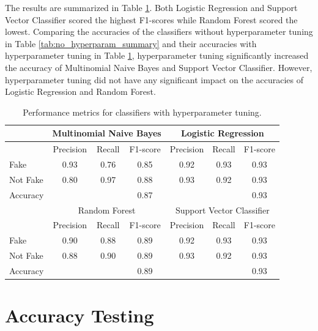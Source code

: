 The results are summarized in Table \ref{tab:hyperparam_summary}. Both Logistic Regression and Support Vector Classifier scored the highest F1-scores while Random Forest scored the lowest. Comparing the accuracies of the classifiers without hyperparameter tuning in Table \ref{tab:no_hyperparam_summary} and their accuracies with hyperparameter tuning in Table \ref{tab:hyperparam_summary}, hyperparameter tuning significantly increased the accuracy of Multinomial Naive Bayes and Support Vector Classifier. However, hyperparameter tuning did not have any significant impact on the accuracies of Logistic Regression and Random Forest.

\begin{table}[ht]
    \centering
    \begin{tabular}{|l|ccc|ccc|}
    \hline
    & \multicolumn{3}{c|}{Multinomial Naive Bayes} & \multicolumn{3}{c|}{Logistic Regression} \\
    \hline
    & Precision & Recall & F1-score & Precision & Recall & F1-score \\
    \hline
    Fake & 0.93 & 0.76 & 0.85 & 0.92 & 0.93 & 0.93 \\
    Not Fake & 0.80 & 0.97 & 0.88 & 0.93 & 0.92 & 0.93 \\
    Accuracy & & & 0.87 & & & 0.93 \\
    \hline
    & \multicolumn{3}{c|}{Random Forest} & \multicolumn{3}{c|}{Support Vector Classifier} \\
    \hline
    & Precision & Recall & F1-score & Precision & Recall & F1-score \\
    \hline
    Fake & 0.90 & 0.88 & 0.89 & 0.92 & 0.93 & 0.93 \\
    Not Fake & 0.88 & 0.90 & 0.89 & 0.93 & 0.92 & 0.93 \\
    Accuracy & & & 0.89 & & & 0.93 \\
    \hline
    \end{tabular}
    \caption{Performance metrics for classifiers with hyperparameter tuning.}
    \label{tab:hyperparam_summary}
\end{table}

\section{Accuracy Testing}

